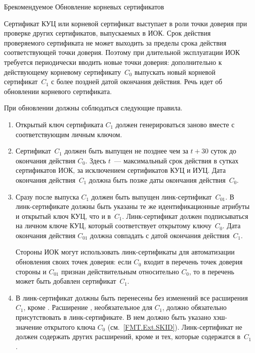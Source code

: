 \begin{appendix}{Б}{рекомендуемое}
{Обновление корневых сертификатов}\label{ROOT}

\mbox{}

Сертификат КУЦ или корневой сертификат выступает в роли точки доверия при
проверке других сертификатов, выпускаемых в ИОК. Срок действия проверяемого
сертификата не может выходить за пределы срока действия соответствующей точки
доверия. Поэтому при длительной эксплуатации ИОК требуется периодически вводить
новые точки доверия: дополнительно к действующему корневому сертификату~$C_0$
выпускать новый корневой сертификат~$C_1$ с более поздней датой окончания
действия. Речь идет об обновлении корневого сертификата. 

При обновлении должны соблюдаться следующие правила.

\begin{enumerate}
\item
Открытый ключ сертификата $C_1$ должен генерироваться заново вместе с 
соответствующим личным ключом. 

\item
Сертификат~$C_1$ должен быть выпущен не позднее чем за $t+30$ суток до 
окончания действия $C_0$. Здесь $t$~--- максимальный срок действия в сутках
сертификатов ИОК, за исключением сертификатов КУЦ и ИУЦ.
%
Дата окончания действия~$C_1$ должна быть позже даты окончания действия~$C_0$.

\item
Сразу после выпуска $C_1$ должен быть выпущен линк-сертификат~$C_{01}$. 
В линк-сертификате должны быть указаны те же идентификационные атрибуты и 
открытый ключ КУЦ, что и в~$C_1$. Линк-сертификат должен подписываться
на личном ключе КУЦ, который соответствует открытому ключу~$C_0$.
%
Дата окончания действия $C_{01}$ должна совпадать с датой окончания 
действия~$C_1$.

Стороны ИОК могут использовать линк-сертификаты для автоматизации обновления 
своих точек доверия: если $C_0$ входит в перечень точек доверия стороны и 
$C_{01}$ признан действительным относительно $C_0$, то в перечень может быть 
добавлен сертификат~$C_1$.

\item
В линк-сертификат должны быть перенесены без изменений все расширения~$C_1$, 
кроме . 
%
Расширение , необязательное для $C_1$, должно 
обязательно присутствовать в линк-сертификате. В нем должно быть указано 
хэш-значение открытого ключа $C_0$ (см.~\ref{FMT.Ext.SKID}).
%
Линк-сертификат не должен содержать других расширений, кроме 
 и тех, которые содержатся в~$C_1$.


\end{enumerate}
\end{appendix}
